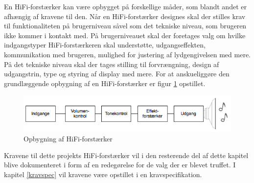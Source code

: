 En HiFi-forstærker kan være opbygget på forskellige måder, som blandt andet er afhængig af kravene til den. Når en HiFi-forstærker designes skal der stilles krav til funktionaliteten på brugerniveau såvel som det tekniske niveau, som brugeren ikke kommer i kontakt med. 
På brugerniveauet skal der foretages valg om hvilke indgangstyper HiFi-forstærkeren skal understøtte, udgangseffekten, kommunikation med brugeren, mulighed for justering af lydgengivelsen med mere. På det tekniske niveau skal der tages stilling til forvrængning, design af udgangstrin, type og styring af display med mere. 
For at anskueliggøre den grundlæggende opbygning af en HiFi-forstærker er figur \ref{fig:forstaerker_opbygning} opstillet.

\begin{figure}[h]
\centering
\includegraphics[scale=.6]{indledende_analyse/generel_effektforstaerker/forstaerker_opbygning.png}
\caption{Opbygning af HiFi-forstærker}
\label{fig:forstaerker_opbygning}
\end{figure}

Kravene til dette projekts HiFi-forstærker vil i den resterende del af dette kapitel blive dokumenteret i form af en redegørelse for de valg der er blevet truffet. I kapitel \ref{kravspec} vil kravene være opstillet i en kravspecifikation.